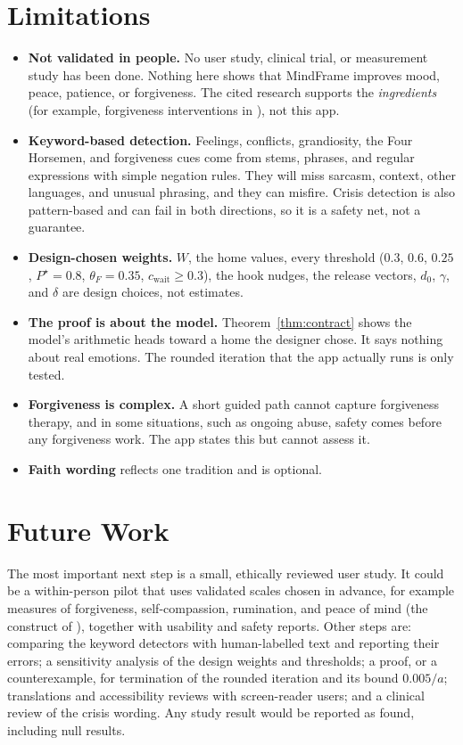 \documentclass[10pt]{article}
\theoremstyle{definition}
\theoremstyle{remark}
\begin{document}
\section{Limitations}
\label{sec:limits}
\begin{itemize}
\item \textbf{Not validated in people.} No user study, clinical trial, or measurement study has been done. Nothing here shows that MindFrame improves mood, peace, patience, or forgiveness. The cited research supports the \emph{ingredients} (for example, forgiveness interventions in \citealp{wade2014}), not this app.
\item \textbf{Keyword-based detection.} Feelings, conflicts, grandiosity, the Four Horsemen, and forgiveness cues come from stems, phrases, and regular expressions with simple negation rules. They will miss sarcasm, context, other languages, and unusual phrasing, and they can misfire. Crisis detection is also pattern-based and can fail in both directions, so it is a safety net, not a guarantee.
\item \textbf{Design-chosen weights.} $W$, the home values, every threshold ($0.3$, $0.6$, $0.25$, $P^\star=0.8$, $\theta_F=0.35$, $c_{\mathrm{wait}}\ge0.3$), the hook nudges, the release vectors, $d_0$, $\gamma$, and $\delta$ are design choices, not estimates.
\item \textbf{The proof is about the model.} Theorem~\ref{thm:contract} shows the model's arithmetic heads toward a home the designer chose. It says nothing about real emotions. The rounded iteration that the app actually runs is only tested.
\item \textbf{Forgiveness is complex.} A short guided path cannot capture forgiveness therapy, and in some situations, such as ongoing abuse, safety comes before any forgiveness work. The app states this but cannot assess it.
\item \textbf{Faith wording} reflects one tradition and is optional.
\end{itemize}

\section{Future Work}
\label{sec:future}
The most important next step is a small, ethically reviewed user study. It could be a within-person pilot that uses validated scales chosen in advance, for example measures of forgiveness, self-compassion, rumination, and peace of mind (the construct of \citealp{lee2013}), together with usability and safety reports. Other steps are: comparing the keyword detectors with human-labelled text and reporting their errors; a sensitivity analysis of the design weights and thresholds; a proof, or a counterexample, for termination of the rounded iteration and its bound $0.005/a$; translations and accessibility reviews with screen-reader users; and a clinical review of the crisis wording. Any study result would be reported as found, including null results.
\end{document}
